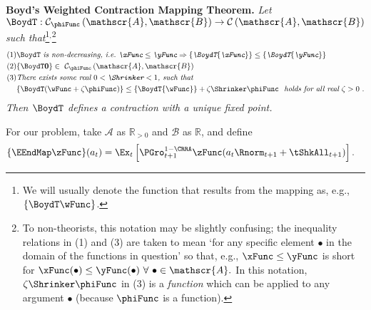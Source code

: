 \documentclass[BufferStockTheory]{subfiles}
\begin{document}
\textbf{Boyd's Weighted Contraction Mapping Theorem.} \textit{Let $\BoydT:\mathcal{C}_{\phiFunc }\left( \mathscr{A},\mathscr{B}\right)
  \rightarrow \mathcal{C}\left( \mathscr{A},\mathscr{B}\right) $ such
  that}\footnote{We will usually denote the function that results from the mapping as, e.g., $\{\BoydT\wFunc\}$.}$^,$\footnote{To non-theorists, this notation may be slightly confusing; the inequality relations in (1) and (3) are taken to mean `for any specific element $\bullet$ in the domain of the functions in question' so that, e.g., $\xFunc \leq \yFunc$ is short for $\xFunc(\bullet) \leq \yFunc(\bullet)~\forall~\bullet\in \mathscr{A}.$  In this notation, $\zeta \Shrinker \phiFunc$ in (3) is a {\it function} which can be applied to any argument $\bullet$ (because $\phiFunc$ is a function).} \nopagebreak
\begin{align*}
  \mbox{(1)} &\BoydT%
               \mbox{ {\it is non-decreasing, i.e.\ ${\xFunc} \leq {\yFunc}\Rightarrow
               \{\BoydT{\xFunc}\} \leq \{\BoydT{\yFunc}\}$}}   \nonumber \\
  \mbox{(2)} & \{\BoydT\mathbf{0}\}\in ~ \mathcal{C}_{\phiFunc }\left(\mathscr{A},\mathscr{B}\right)  \notag \\
  \mbox{(3)}
             & \mbox{\it There exists some real $0 < \Shrinker < 1$, such that} \\
             & \{\BoydT({\wFunc} +\zeta\phiFunc )\} \leq \{\BoydT{\wFunc}\} +\zeta\Shrinker \phiFunc
               \mbox{ {\it ~holds for all real $\zeta > 0$} }.
\end{align*}%
\textit{Then $\BoydT$ defines a contraction with a unique fixed point.}

For our problem, take $\mathscr{A}$ as $\mathbb{R}_{>0}$ and $\mathscr{B}$
as $\mathbb{R}$, and define
\begin{align*}
  \{\EEndMap \zFunc\}(a_{t})  & = \Ex_{t}\left[\PGro^{1-\CRRA}_{t+1} \zFunc(a_{t} \Rnorm_{t+1} + \tShkAll_{t+1})\right].
\end{align*}
\end{document}
